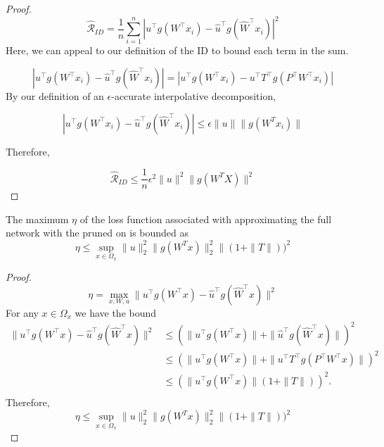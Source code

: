 \begin{proof}
\begin{equation}
    \hat{\mathcal{R}}_{ID}=\frac{1}{n}\sum_{i=1}^n |u^\top g(W^\top x_i) - \widehat{u}^\top g(\widehat{W}^\top x_i) |^2
\end{equation}
Here, we can appeal to our definition of the ID to bound each term in the sum.    

\begin{equation}
    |u^\top g(W^\top x_i) - \widehat{u}^\top g(\widehat{W}^\top x_i) | =|u^\top g(W^\top x_i) - {u}^\top  T^\top g(P^\top {W}^\top x_i) |
\end{equation}
By our definition of an $\epsilon$-accurate interpolative decomposition, 

\begin{equation}
    |u^\top g(W^\top x_i) - \widehat{u}^\top g(\widehat{W}^\top x_i) | \leq  \epsilon \|u\| \| g(W^T x_i)\|
\end{equation}

Therefore, 

\begin{equation}
    \hat{\mathcal{R}}_{ID} \leq \frac{1}{n} \epsilon^2 \|u\| ^2 \| g(W^T X)\|^2
\end{equation}
\end{proof}

\begin{lemma}
\label{lem:eta}
The maximum $\eta$ of the loss function associated with approximating the full network with the pruned on is bounded as   
\[
    \eta \leq \sup_{x\in\Omega_x} \|u\|_2^2 \| g(W^T x)\|_2^2 \|(1+ \|T\|))^2
\]

\end{lemma}
\begin{proof} 
\begin{equation*}
    \eta=\max_{x, W, u} \| u^\top g(W^\top x ) - \widehat{ u}^\top g (\widehat{W}^\top x) \|^2
\end{equation*}
For any $x\in\Omega_x$ we have the bound 
\begin{equation*}
\begin{aligned}
    \| u^\top g(W^\top x ) - \widehat{ u}^\top g (\widehat{W}^\top x) \|^2 &\leq (\|u^\top g(W^\top x) \| + \|\widehat{ u}^\top g (\widehat{W}^\top x) \|)^2\\
     &\leq (\|u^\top g(W^\top x) \| + \|{u}^\top  T^\top g(P^\top {W}^\top x)\|)^2\\
     &\leq (\|u^\top g(W^\top x)\|(1+ \|T\|))^2.\\
\end{aligned}
\end{equation*}
Therefore, 
\begin{equation*}
    \eta \leq \sup_{x\in\Omega_x} \|u\|_2^2 \| g(W^T x)\|_2^2 \|(1+ \|T\|))^2
\end{equation*}

\end{proof}

